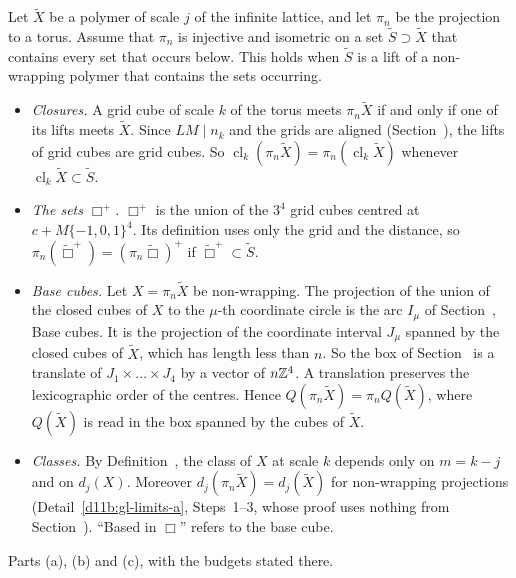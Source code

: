 \begin{step}
Let $\tilde X$ be a polymer of scale $j$ of the infinite lattice, and let $\pi_n$ be the projection to a torus. Assume that $\pi_n$ is injective and isometric on a set $\tilde S\supset\tilde X$ that contains every set that occurs below. This holds when $\tilde S$ is a lift of a non-wrapping polymer that contains the sets occurring.
\begin{itemize}
\item \emph{Closures.} A grid cube of scale $k$ of the torus meets $\pi_n\tilde X$ if and only if one of its lifts meets $\tilde X$. Since $LM\mid n_{k}$ and the grids are aligned (Section~), the lifts of grid cubes are grid cubes. So $\operatorname{cl}_k(\pi_n\tilde X)=\pi_n(\operatorname{cl}_k\tilde X)$ whenever $\operatorname{cl}_k\tilde X\subset\tilde S$.
\item \emph{The sets $\Box^+$.} $\Box^+$ is the union of the $3^4$ grid cubes centred at $c+M\{-1,0,1\}^4$. Its definition uses only the grid and the distance, so $\pi_n(\tilde\Box^+)=(\pi_n\tilde\Box)^+$ if $\tilde\Box^+\subset\tilde S$.
\item \emph{Base cubes.} Let $X=\pi_n\tilde X$ be non-wrapping. The projection of the union of the closed cubes of $X$ to the $\mu$-th coordinate circle is the arc $I_\mu$ of Section~, Base cubes. It is the projection of the coordinate interval $J_\mu$ spanned by the closed cubes of $\tilde X$, which has length less than $n$. So the box of Section~ is a translate of $J_1\times\dots\times J_4$ by a vector of $n\mathbb Z^4$. A translation preserves the lexicographic order of the centres. Hence $Q(\pi_n\tilde X)=\pi_nQ(\tilde X)$, where $Q(\tilde X)$ is read in the box spanned by the cubes of $\tilde X$.
\item \emph{Classes.} By Definition~, the class of $X$ at scale $k$ depends only on $m=k-j$ and on $d_j(X)$. Moreover $d_j(\pi_n\tilde X)=d_j(\tilde X)$ for non-wrapping projections (Detail~\ref{d11b:gl-limits-a}, Steps~1--3, whose proof uses nothing from Section~). ``Based in $\Box$'' refers to the base cube.
\end{itemize}
\end{step}

\begin{detail}\label{d11b:gl-flat}
Parts (a), (b) and (c), with the budgets stated there.
\end{detail}

